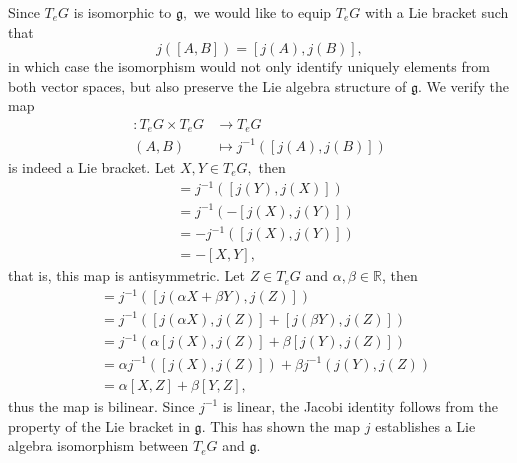 Since \(T_eG\) is isomorphic to \(\mathfrak{g},\) we would like to equip \(T_eG\) with a Lie bracket such that
\begin{equation*}
    j([A,B]) = [j(A), j(B)],
\end{equation*}
in which case the isomorphism would not only identify uniquely elements from both vector spaces, but also preserve the Lie algebra structure of \(\mathfrak{g}\). We verify the map
\begin{align*}
    [\cdot, \cdot] : T_eG \times T_eG &\to T_eG\\
                                (A,B) &\mapsto j^{-1}\left([j(A), j(B)]\right)
\end{align*}
is indeed a Lie bracket.
Let \(X, Y \in T_eG,\) then
\begin{align*}
    [Y,X] &= j^{-1}\left([j(Y), j(X)]\right)\\
          &= j^{-1}(-[j(X), j(Y)])\\
          &= - j^{-1}([j(X),j(Y)])\\
          &= -[X,Y],
\end{align*}
that is, this map is antisymmetric. Let \(Z \in T_eG\) and \(\alpha,\beta \in \mathbb{R}\), then
\begin{align*}
    [\alpha X + \beta Y, Z] &= j^{-1}([j\left(\alpha X + \beta Y\right), j(Z)])\\
                            &= j^{-1}([j(\alpha X), j(Z)] + [j(\beta Y), j(Z)])\\
                            &= j^{-1}(\alpha[j(X), j(Z)] + \beta[j(Y), j(Z)])\\
                            &= \alpha j^{-1}([j(X), j(Z)]) + \beta j^{-1}(j(Y), j(Z))\\
                            &= \alpha [X, Z] + \beta [Y, Z],
\end{align*}
thus the map is bilinear. Since \(j^{-1}\) is linear, the Jacobi identity follows from the property of the Lie bracket in \(\mathfrak{g}\). This has shown the map \(j\) establishes a Lie algebra isomorphism between \(T_eG\) and \(\mathfrak{g}\).

